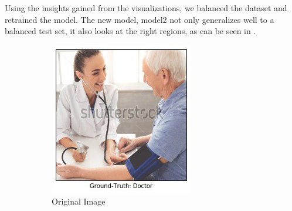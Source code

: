 Using the insights gained from the \gcam{} visualizations, we balanced the dataset and retrained the model. The new model, model2 not only generalizes well to a balanced test set, it also looks at the right regions, as can be seen in .
\begin{figure}[ht!]
\vspace{20pt}
  \begin{center}
    \begin{subfigure}[b]{0.32\linewidth}
        \centering
        \includegraphics[width=1\linewidth]{figures/71_orig_balanced.jpg}
		\caption{\tiny{Original Image}}
        \vspace{10pt}
    \end{subfigure}
    \begin{subfigure}[b]{0.32\linewidth}
        \centering

\end{subfigure}
\end{center}
\end{figure}

